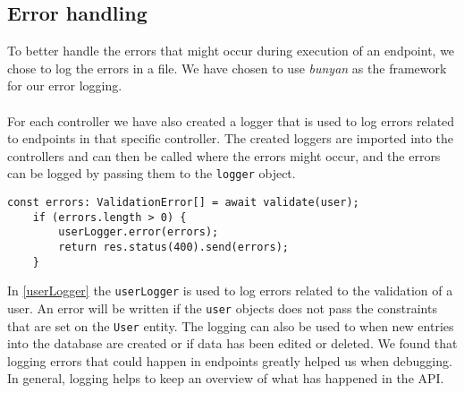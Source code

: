 \subsection{Error handling}
To better handle the errors that might occur during execution of an endpoint, we chose to log the errors in a file.
We have chosen to use \textit{bunyan} as the framework for our error logging.
\\\\
For each controller we have also created a logger that is used to log errors related to endpoints in that specific controller.
The created loggers are imported into the controllers and can then be called where the errors might occur, and the errors can be logged by passing them to the \texttt{logger} object.
\begin{lstlisting}[caption={Shows how the userLogger is used to log errors}, captionpos=b, label={userLogger}]
    const errors: ValidationError[] = await validate(user);
    if (errors.length > 0) {
        userLogger.error(errors);
        return res.status(400).send(errors);
    }
\end{lstlisting}
In \autoref{userLogger} the \texttt{userLogger} is used to log errors related to the validation of a user. 
An error will be written if the \texttt{user} objects does not pass the constraints that are set on the \texttt{User} entity.
The logging can also be used to when new entries into the database are created or if data has been edited or deleted.
We found that logging errors that could happen in endpoints greatly helped us when debugging.
In general, logging helps to keep an overview of what has happened in the API.
